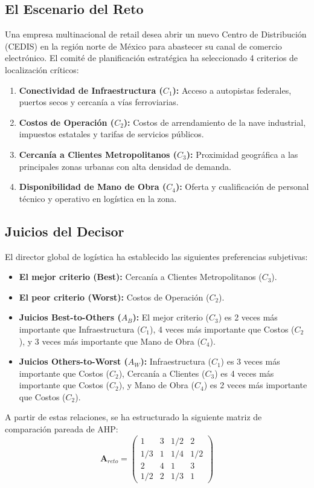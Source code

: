 \documentclass[11pt, letterpaper]{article}
\begin{document}
\subsection{El Escenario del Reto}
Una empresa multinacional de retail desea abrir un nuevo Centro de Distribución (CEDIS) en la región norte de México para abastecer su canal de comercio electrónico. El comité de planificación estratégica ha seleccionado 4 criterios de localización críticos:
\begin{enumerate}
    \item \textbf{Conectividad de Infraestructura ($C_1$):} Acceso a autopistas federales, puertos secos y cercanía a vías ferroviarias.
    \item \textbf{Costos de Operación ($C_2$):} Costos de arrendamiento de la nave industrial, impuestos estatales y tarifas de servicios públicos.
    \item \textbf{Cercanía a Clientes Metropolitanos ($C_3$):} Proximidad geográfica a las principales zonas urbanas con alta densidad de demanda.
    \item \textbf{Disponibilidad de Mano de Obra ($C_4$):} Oferta y cualificación de personal técnico y operativo en logística en la zona.
\end{enumerate}

\subsection{Juicios del Decisor}
El director global de logística ha establecido las siguientes preferencias subjetivas:
\begin{itemize}
    \item \textbf{El mejor criterio (Best):} Cercanía a Clientes Metropolitanos ($C_3$).
    \item \textbf{El peor criterio (Worst):} Costos de Operación ($C_2$).
    \item \textbf{Juicios Best-to-Others ($A_B$):} El mejor criterio ($C_3$) es 2 veces más importante que Infraestructura ($C_1$), 4 veces más importante que Costos ($C_2$), y 3 veces más importante que Mano de Obra ($C_4$).
    \item \textbf{Juicios Others-to-Worst ($A_W$):} Infraestructura ($C_1$) es 3 veces más importante que Costos ($C_2$), Cercanía a Clientes ($C_3$) es 4 veces más importante que Costos ($C_2$), y Mano de Obra ($C_4$) es 2 veces más importante que Costos ($C_2$).
\end{itemize}

A partir de estas relaciones, se ha estructurado la siguiente matriz de comparación pareada de AHP:
\begin{equation}
    \mathbf{A}_{reto} = \begin{pmatrix}
        1 & 3 & 1/2 & 2 \\
        1/3 & 1 & 1/4 & 1/2 \\
        2 & 4 & 1 & 3 \\
        1/2 & 2 & 1/3 & 1
    \end{pmatrix}
\end{equation}
\end{document}
